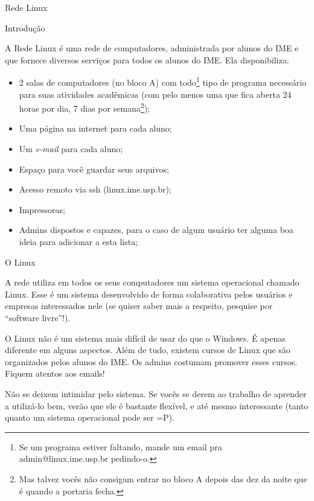 \begin{subsecao}{Rede Linux}


\begin{subsubsecao}{Introdução}

A Rede Linux é uma rede de computadores, administrada por alunos do IME e
que fornece diversos serviços para todos os alunos do IME.
Ela disponibiliza:

\vspace{-1em}

\begin{itemize}
\item 2 salas de computadores (no bloco A) com todo\footnote{ Se um programa
estiver faltando, mande um email pra admin@linux.ime.usp.br pedindo-o.} tipo de
programa necessário para suas atividades acadêmicas (com pelo menos uma que fica
aberta 24 horas por dia, 7 dias por semana\footnote{ Mas talvez vocês não
consigam entrar no bloco A depois das dez da noite que é quando a portaria
fecha.});
\item Uma página na internet para cada aluno;
\item Um \textit{e-mail} para cada aluno;
\item Espaço para você guardar seus arquivos;
\item Acesso remoto via ssh (linux.ime.usp.br);
\item Impressoras;
\item Admins dispostos e capazes, para o caso de algum usuário ter alguma boa
ideia para adicionar a esta lista;
\end{itemize}
\end{subsubsecao}

\begin{subsubsecao}{O Linux}

A rede utiliza em todos os seus computadores um sistema operacional chamado
Linux. Esse é um sistema desenvolvido de forma colaborativa pelos usuários
e empresas interessados nele (se quiser saber mais a respeito, pesquise
por ``software livre''!).

O Linux não é um sistema mais difícil de usar do que o Windows. É apenas
diferente em alguns aspectos. Além de tudo, existem cursos de Linux que são
organizados pelos alunos do IME. Os admins costumam promover esses cursos.
Fiquem atentos aos emails!

Não se deixem intimidar pelo sistema. Se vocês se derem ao trabalho de
aprender a utilizá-lo bem, verão que ele é bastante flexível, e até mesmo
interessante (tanto quanto um sistema operacional pode ser =P).


\end{subsubsecao}
\end{subsecao}
